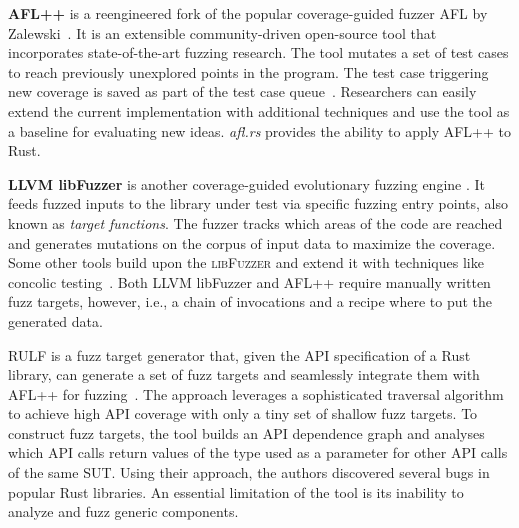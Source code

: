 \documentclass[paper=a4,%
  twoside,%
  BCOR4mm,%
  abstract=true,%
  toc=bibliography,%
  chapterprefix=true,%
  toc=bibliographynumbered,%
  open=right,%
  english,%
  pagesize=pdftex]{scrreprt}
\newcommand{\sut}{\ac{SUT}\xspace}
\begin{document}
\textbf{AFL++} is a reengineered fork of the popular coverage-guided fuzzer \textsc{AFL} by Zalewski~\cite{Zalewski2014}. It is an extensible community-driven open-source tool that incorporates state-of-the-art fuzzing research. The tool mutates a set of test cases to reach previously unexplored points in the program. The test case triggering new coverage is saved as part of the test case queue~\cite{Fioraldi2020}. Researchers can easily extend the current implementation with additional techniques and use the tool as a baseline for evaluating new ideas. \emph{afl.rs} provides the ability to apply \textsc{AFL++} to Rust.

\textbf{LLVM libFuzzer} is another coverage-guided evolutionary fuzzing engine . It feeds fuzzed inputs to the library under test via specific fuzzing entry points, also known as \emph{target functions}. The fuzzer tracks which areas of the code are reached and generates mutations on the corpus of input data to maximize the coverage. Some other tools build upon the \textsc{libFuzzer} and extend it with techniques like concolic testing~\cite{Rocha2020,Le2019}. Both LLVM libFuzzer and \textsc{AFL++} require manually written fuzz targets, however, i.e., a chain of invocations and a recipe where to put the generated data.

\textsc{RULF} is a fuzz target generator that, given the \ac{API} specification of a Rust library, can generate a set of fuzz targets and seamlessly integrate them with \textsc{AFL++} for fuzzing~\cite{Jiang2021}. The approach leverages a sophisticated traversal algorithm to achieve high \ac{API} coverage with only a tiny set of shallow fuzz targets. To construct fuzz targets, the tool builds an \ac{API} dependence graph and analyses which \ac{API} calls return values of the type used as a parameter for other \ac{API} calls of the same \sut. Using their approach, the authors discovered several bugs in popular Rust libraries. An essential limitation of the tool is its inability to analyze and fuzz generic components.
\end{document}
